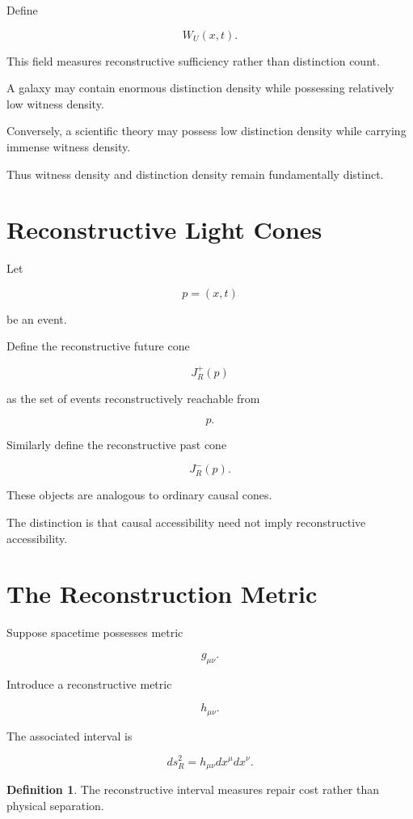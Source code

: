 \documentclass[12pt,oneside]{book}
\theoremstyle{plain} \newtheorem{theorem}{Theorem}[chapter] \newtheorem{lemma}[theorem]{Lemma} \newtheorem{proposition}[theorem]{Proposition} \newtheorem{corollary}[theorem]{Corollary}
\theoremstyle{definition} \newtheorem{definition}[theorem]{Definition} \newtheorem{axiom}[theorem]{Axiom} \newtheorem{construction}[theorem]{Construction}
\theoremstyle{remark} \newtheorem{remark}[theorem]{Remark} \newtheorem{example}[theorem]{Example}
\begin{document}
Define

\[
W_U(x,t).
\]

This field measures reconstructive sufficiency rather than distinction count.

A galaxy may contain enormous distinction density while possessing relatively low witness density.

Conversely, a scientific theory may possess low distinction density while carrying immense witness density.

Thus witness density and distinction density remain fundamentally distinct.

\section{Reconstructive Light Cones}

Let

\[
p
=
(x,t)
\]

be an event.

Define the reconstructive future cone

\[
J_R^+(p)
\]

as the set of events reconstructively reachable from

\[
p.
\]

Similarly define the reconstructive past cone

\[
J_R^-(p).
\]

These objects are analogous to ordinary causal cones.

The distinction is that causal accessibility need not imply reconstructive accessibility.

\section{The Reconstruction Metric}

Suppose spacetime possesses metric

\[
g_{\mu\nu}.
\]

Introduce a reconstructive metric

\[
h_{\mu\nu}.
\]

The associated interval is

\[
ds_R^2
=
h_{\mu\nu}
dx^\mu dx^\nu.
\]

\begin{definition}

The reconstructive interval measures repair cost rather than physical separation.

\end{definition}
\end{document}
